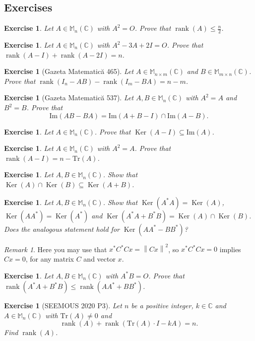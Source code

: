\documentclass[12pt]{article}
\newcommand{\norm}[1]{\left\lVert #1 \right\rVert}
\renewcommand{\Tr}{\mathrm{Tr}}
\DeclareMathOperator{\Rank}{rank}
\DeclareMathOperator{\Ker}{Ker}
\theoremstyle{breakplain}
\theoremstyle{breakdef}
\newtheorem{ex}[subsubsection]{Exercise}
\theoremstyle{remark}
\newtheorem*{remark}{Remark}
\begin{document}
\subsection{Exercises}
\begin{ex}
    Let $A\in \mathbb{M}_{n}(\mathbb{C})$ with $A^2=O$. Prove that $\Rank(A)\leq \frac{n}{2}$.
\end{ex}
\begin{ex}
    Let $A\in \mathbb{M}_{n}(\mathbb{C})$ with $A^2-3A+2I=O$. Prove that $\Rank(A-I)+\Rank(A-2I)=n$.
\end{ex}
\begin{ex}[Gazeta Matematic\u{a} 465]
    Let $A\in \mathbb{M}_{n\times m}(\mathbb{C})$ and $B\in \mathbb{M}_{m\times n}(\mathbb{C})$.
    Prove that $\Rank(I_n-AB)-\Rank(I_m-BA)=n-m$.
\end{ex}
\begin{ex}[Gazeta Matematic\u{a} 537]
    Let $A,B\in \mathbb{M}_n(\mathbb{C})$ with $A^2=A$ and $B^2=B$. Prove that
    \[\mathrm{Im}(AB-BA)=\mathrm{Im}(A+B-I)\cap \mathrm{Im}(A-B).\]
\end{ex}
\begin{ex}
    Let $A\in \mathbb{M}_n(\mathbb{C})$. Prove that $\Ker(A-I)\subseteq \mathrm{Im}(A)$.
\end{ex}
\begin{ex}
    Let $A\in \mathbb{M}_n(\mathbb{C})$ with $A^2=A$. Prove that $\Rank(A-I)=n-\Tr(A)$.
\end{ex}
\begin{ex}
    Let $A,B\in \mathbb{M}_n(\mathbb{C})$. Show that $\Ker(A)\cap \Ker(B)\subseteq \Ker(A+B)$.
\end{ex}
\begin{ex}
    Let $A,B\in \mathbb{M}_n(\mathbb{C})$. Show that $\Ker(A^*A)=\Ker(A)$, $\Ker(AA^*)=\Ker(A^*)$ and $\Ker(A^*A+B^*B)=\Ker(A)\cap \Ker(B)$.
    Does the analogous statement hold for $\Ker(AA^*-BB^*)$?
\end{ex}
\begin{remark}
    Here you may use that $x^*C^*Cx=\norm{Cx}^2$, so $x^*C^*Cx=0$ implies $Cx=0$, for any matrix $C$ and vector $x$.
\end{remark}
\begin{ex}
    Let $A,B\in \mathbb{M}_n(\mathbb{C})$ with $A^*B=O$. Prove that $\Rank(A^*A+B^*B)\leq \Rank(AA^*+BB^*)$.
\end{ex}
\begin{ex}[SEEMOUS 2020 P3]
    Let $n$ be a positive integer, $ k\in \mathbb{C}$ and $A\in \mathbb{M}_n(\mathbb{C})$ with $ \Tr(A) \neq 0 $ and
    \[\Rank(A)+\Rank(\Tr(A)\cdot I-kA)=n.\]
    Find $\Rank(A)$.
\end{ex}
\end{document}
